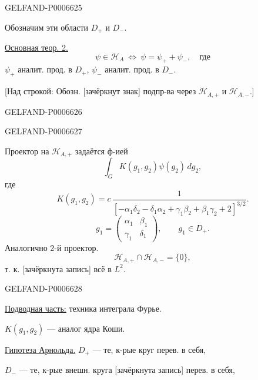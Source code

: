 \begin{GelfandAdjacentEvidence}{GELFAND-P000662}{5}

Обозначим эти области \(D_+\) и \(D_-\).

\underline{Основная теор. 2.}
\[
\psi\in\mathcal H_A\ \Longleftrightarrow\ \psi=\psi_++\psi_-,\quad\text{где}
\]
\(\psi_+\) аналит. прод. в \(D_+\), \(\psi_-\) аналит. прод. в \(D_-\).

[Над строкой: Обозн. [зачёркнут знак] подпр-ва через
\(\mathcal H_{A,+}\) и \(\mathcal H_{A,-}\).]
\end{GelfandAdjacentEvidence}
\begin{GelfandAdjacentEvidence}{GELFAND-P000662}{6}

\end{GelfandAdjacentEvidence}
\begin{GelfandAdjacentEvidence}{GELFAND-P000662}{7}


Проектор на \(\mathcal H_{A,+}\) задаётся ф-ией
\[
\int_G K(g_1,g_2)\psi(g_2)\,dg_2,
\]
где
\[
K(g_1,g_2)=c\,\frac{1}{[-\alpha_1\delta_2-\delta_1\alpha_2+\gamma_1\beta_2+\beta_1\gamma_2+2]^{3/2}}.
\]
\[
g_1=\begin{pmatrix}\alpha_1&\beta_1\\\gamma_1&\delta_1\end{pmatrix},
\qquad g_1\in D_+.
\]
Аналогично 2-й проектор.
\[
\mathcal H_{A,+}\cap\mathcal H_{A,-}=\{0\},
\]
т. к. [зачёркнута запись] всё в \(L^2\).
\end{GelfandAdjacentEvidence}
\begin{GelfandAdjacentEvidence}{GELFAND-P000662}{8}


\underline{\underline{Подводная часть:}} техника интеграла Фурье.

\(K(g_1,g_2)\) --- аналог ядра Коши.

\underline{Гипотеза Арнольда.} \(D_+\) --- те, к-рые круг перев. в себя,

\(D_-\) --- те, к-рые внешн. круга [зачёркнута запись] перев. в себя,
\end{GelfandAdjacentEvidence}


